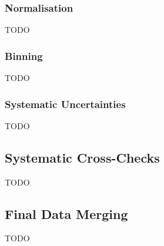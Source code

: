 
\subsubsection{Normalisation}
\label{sec:normalisation}

TODO


\subsubsection{Binning}
\label{sec:binning}

TODO


\subsubsection{Systematic Uncertainties}
\label{sec:systematics}

TODO


\subsection{Systematic Cross-Checks}
\label{sec:cross checks}

TODO


\subsection{Final Data Merging}
\label{sec:final data merging}

TODO
